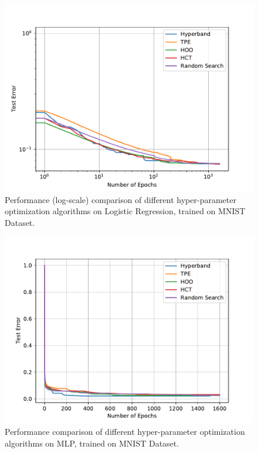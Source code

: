 \documentclass[runningheads,a4paper]{llncs}
\begin{document}
\begin{figure}[ht]
    \centering
    \includegraphics[scale=0.8]{img/mnist/logistic_0.pdf}
    \caption{Performance (log-scale) comparison of different hyper-parameter optimization algorithms on Logistic Regression, trained on MNIST Dataset.}
    \label{logistic_0}
\end{figure}

\begin{figure}[ht]
    \centering
    \includegraphics[scale=0.8]{img/mnist/mlp_0.pdf}
    \caption{Performance comparison of different hyper-parameter optimization algorithms on MLP, trained on MNIST Dataset.}
    \label{mlp_0}
\end{figure}
\end{document}

